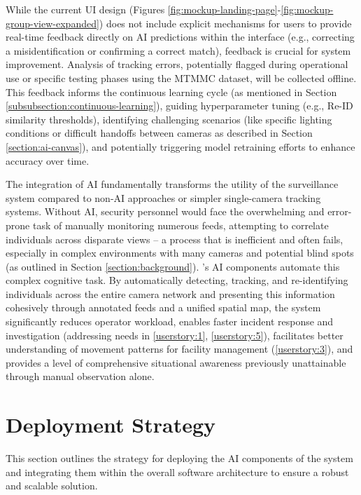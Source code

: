 While the current UI design (Figures \ref{fig:mockup-landing-page}-\ref{fig:mockup-group-view-expanded}) does not include explicit mechanisms for users to provide real-time feedback directly on AI predictions within the interface (e.g., correcting a misidentification or confirming a correct match), feedback is crucial for system improvement. Analysis of tracking errors, potentially flagged during operational use or specific testing phases using the MTMMC dataset, will be collected offline. This feedback informs the continuous learning cycle (as mentioned in Section \ref{subsubsection:continuous-learning}), guiding hyperparameter tuning (e.g., Re-ID similarity thresholds), identifying challenging scenarios (like specific lighting conditions or difficult handoffs between cameras as described in Section \ref{section:ai-canvas}), and potentially triggering model retraining efforts to enhance accuracy over time.

The integration of AI fundamentally transforms the utility of the surveillance system compared to non-AI approaches or simpler single-camera tracking systems. Without AI, security personnel would face the overwhelming and error-prone task of manually monitoring numerous feeds, attempting to correlate individuals across disparate views – a process that is inefficient and often fails, especially in complex environments with many cameras and potential blind spots (as outlined in Section \ref{section:background}). \usevar{\srsTitle}'s AI components automate this complex cognitive task. By automatically detecting, tracking, and re-identifying individuals across the entire camera network and presenting this information cohesively through annotated feeds and a unified spatial map, the system significantly reduces operator workload, enables faster incident response and investigation (addressing needs in \ref{userstory:1}, \ref{userstory:5}), facilitates better understanding of movement patterns for facility management (\ref{userstory:3}), and provides a level of comprehensive situational awareness previously unattainable through manual observation alone.

\section{Deployment Strategy}
\label{section:ai-deployment}

This section outlines the strategy for deploying the AI components of the \usevar{\srsTitle} system and integrating them within the overall software architecture to ensure a robust and scalable solution.

